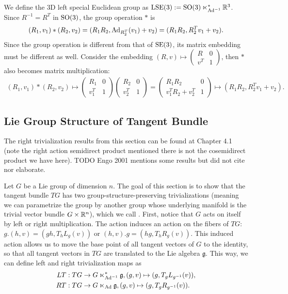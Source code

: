 \documentclass[12pt,class=article,crop=false]{standalone}
\begin{document}
\begin{eg}
We define the 3D left special Euclidean group as $ \operatorname{LSE}(3) := \operatorname{SO}(3) \ltimes_{\operatorname{Ad}^{-1}}^* \mathbb{R}^3$. Since $ R^{-1} = R^{T}$ in $ \operatorname{SO}(3)$, the group operation $ *$ is
 \begin{align*}
	(R_1,v_1)*(R_2,v_2) = (R_1R_2, \operatorname{Ad}_{ R_2^{T}}( v_1) + v_2) = (R_1R_2, R_2^{T} v_1 + v_2). 
\end{align*}
Since the group operation is different from that of $ \operatorname{SE}(3)$, its matrix embedding must be different as well. Consider the embedding $ (R,v) \mapsto \begin{pmatrix} R & 0\\v^{T}&1 \end{pmatrix} $, then $ *$ also becomes matrix multiplication:
\begin{align*}
	 (R_1,v_1)*(R_2,v_2) \mapsto  \begin{pmatrix} R_1& 0\\ v_1^{T} & 1 \end{pmatrix} \begin{pmatrix} R_2 & 0\\ v_2^{T}& 1 \end{pmatrix} = \begin{pmatrix} R_1R_2& 0\\ v_1^{T}R_2 + v_2^{T} &1 \end{pmatrix} \mapsto (R_1 R_2, R_2^{T}v_1 + v_2) .
\end{align*}
\end{eg}

\subsection{Lie Group Structure of Tangent Bundle}
The right trivialization results from this section can be found at \cite{MarsdenRatiu1999} Chapter 4.1 (note the right action semidirect product mentioned there is not the cosemidirect product we have here). TODO Engo 2001 mentions some results but did not cite nor elaborate. 

Let $ G$ be a Lie group of dimension $ n$. The goal of this section is to show that the tangent bundle $ TG$  has two group-structure-preserving trivializations (meaning we can parametrize the group by another group whose underlying manifold is the trivial vector bundle $ G\times \mathbb{R}^{n}$), which we call . First, notice that $ G$ acts on itself by left or right multiplication. The action induces an action on the fibers of $ TG$: $ g.(h,v) = (gh, T_h L_g(v))$ or $(h,v).g = (hg, T_hR_g(v))$.  This induced action allows us to move the base point of all tangent vectors of $ G$ to the identity, so that all tangent vectors in $ TG$ are translated to the Lie algebra $ \mathfrak{g}$. This way, we can define left and right trivialization maps as
\begin{align*}
	LT &: TG \to G \ltimes_{\operatorname{Ad}^{-1}}^*   \mathfrak{g}, (g,v) \mapsto (g, T_g L_{g^{-1}}(v)),\\
	RT &: TG \to G \ltimes_{\operatorname{Ad}}   \mathfrak{g}, (g,v) \mapsto (g, T_g R_{g^{-1}}(v)).
\end{align*}
\end{document}
